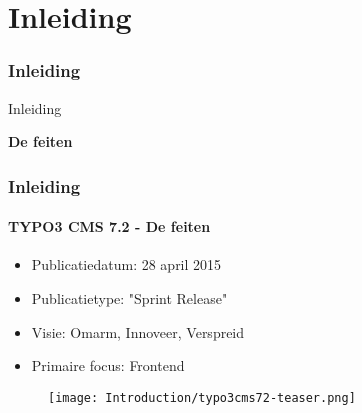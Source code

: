 %

\section{Inleiding}
\begin{frame}[fragile]
	\frametitle{Inleiding}

	\begin{center}\huge{Inleiding}\end{center}
	\begin{center}\huge{\color{typo3darkgrey}\textbf{De feiten}}\end{center}

\end{frame}

\begin{frame}[fragile]
	\frametitle{Inleiding}
	\framesubtitle{TYPO3 CMS 7.2 - De feiten}

	\begin{itemize}
		\item Publicatiedatum: 28 april 2015
		\item Publicatietype: "Sprint Release"
		\item Visie: Omarm, Innoveer, Verspreid
		\item Primaire focus: Frontend
	\end{itemize}

	\begin{figure}
		\texttt{[image: Introduction/typo3cms72-teaser.png]}
	\end{figure}

\end{frame}

